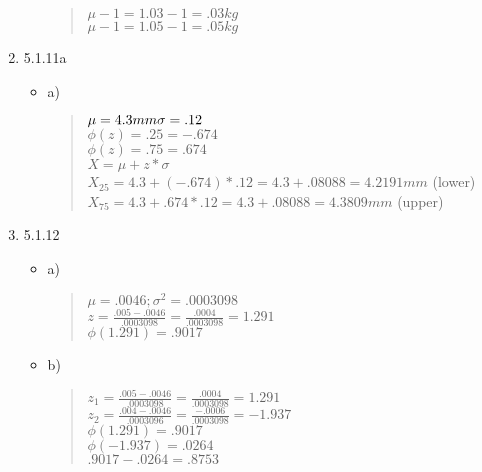 \documentclass{article}
\begin{document}
\begin{enumerate}
\begin{itemize}
            \begin{quote}
                $\mu - 1 = 1.03 -1 =.03 kg$ \\
                $\mu - 1 = 1.05 - 1 = .05 kg$
            \end{quote}
        \end{itemize}
    \item 5.1.11a
        \begin{itemize}
            \item a)
            \begin{quote}
                $\mu = 4.3 mm \\ \sigma = .12$ \\
                $\phi(z) = .25 = -.674$ \\
                $\phi(z) = .75 = .674$ \\
                $X = \mu + z * \sigma$ \\
                $X_{25} = 4.3+(-.674)*.12 = 4.3+.08088 = 4.2191 mm$ (lower) \\
                $X_{75} = 4.3+.674*.12 = 4.3+.08088 = 4.3809 mm$ (upper)
            \end{quote}
        \end{itemize}
    \item 5.1.12
        \begin{itemize}
            \item a)
            \begin{quote}
                $\mu = .0046; \sigma^{2} = .0003098$ \\ 
                $z = \frac{.005-.0046}{.0003098} = \frac{.0004}{.0003098} = 1.291$ \\
                $\phi(1.291) = .9017$
            \end{quote}
        \end{itemize}
        \begin{itemize}
            \item b)
            \begin{quote}
                $z_{1} = \frac{.005-.0046}{.0003098} = \frac{.0004}{.0003098} = 1.291$ \\
                $z_{2} = \frac{.004-.0046}{.0003096} = \frac{-.0006}{.0003098} = -1.937$ \\
                $\phi(1.291) = .9017$ \\
                $\phi(-1.937) = .0264$ \\
                $.9017-.0264 = .8753$
            \end{quote}

\end{itemize}
\end{enumerate}
\end{document}
